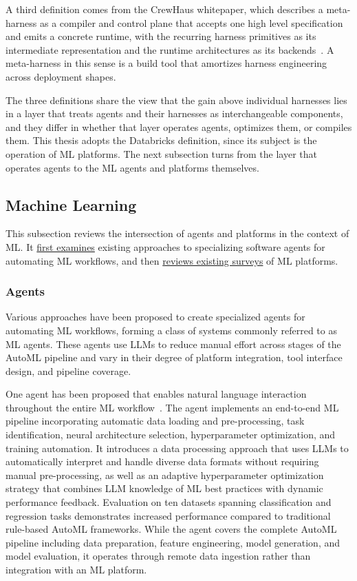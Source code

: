 \documentclass[
english,                 %
bibtex,                  %
]{kththesis}
\numberwithin{listing}{chapter}
\begin{document}
A third definition comes from the CrewHaus whitepaper, which describes a meta-harness as a compiler and control plane that accepts one high level specification and emits a concrete runtime, with the recurring harness primitives as its intermediate representation and the runtime architectures as its backends~\cite{meier_crewhaus_2026}. A meta-harness in this sense is a build tool that amortizes harness engineering across deployment shapes.

The three definitions share the view that the gain above individual harnesses lies in a layer that treats agents and their harnesses as interchangeable components, and they differ in whether that layer operates agents, optimizes them, or compiles them. This thesis adopts the Databricks definition, since its subject is the operation of \gls{ML} platforms. The next subsection turns from the layer that operates agents to the \gls{ML} agents and platforms themselves.

\subsection{Machine Learning}
\label{sec:bg_machine_learning}
\glsresetall

This subsection reviews the intersection of agents and platforms in the context of \gls{ML}. It \hyperref[sec:bg_agents_2]{first examines} existing approaches to specializing software agents for automating \gls{ML} workflows, and then \hyperref[sec:bg_platforms]{reviews existing surveys} of \gls{ML} platforms.

\subsubsection{Agents}
\label{sec:bg_agents_2}

Various approaches have been proposed to create specialized agents for automating \gls{ML} workflows, forming a class of systems commonly referred to as \gls{ML} agents. These agents use \glspl{LLM} to reduce manual effort across stages of the \gls{AutoML} pipeline and vary in their degree of platform integration, tool interface design, and pipeline coverage.

One agent has been proposed that enables natural language interaction throughout the entire \gls{ML} workflow~\cite{huang_human-centered_2025}. The agent implements an end-to-end \gls{ML} pipeline incorporating automatic data loading and pre-processing, task identification, neural architecture selection, hyperparameter optimization, and training automation. It introduces a data processing approach that uses \glspl{LLM} to automatically interpret and handle diverse data formats without requiring manual pre-processing, as well as an adaptive hyperparameter optimization strategy that combines \gls{LLM} knowledge of \gls{ML} best practices with dynamic performance feedback. Evaluation on ten datasets spanning classification and regression tasks demonstrates increased performance compared to traditional rule-based \gls{AutoML} frameworks. While the agent covers the complete \gls{AutoML} pipeline including data preparation, feature engineering, model generation, and model evaluation, it operates through remote data ingestion rather than integration with an \gls{ML} platform.
\end{document}
